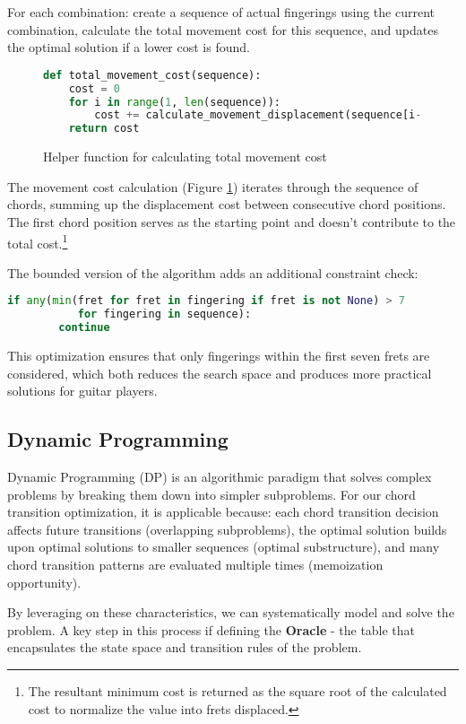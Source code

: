 \documentclass[conference]{IEEEtran}
\begin{document}
For each combination: create a sequence of actual fingerings using the current combination, calculate the total movement cost for this sequence, and updates the optimal solution if a lower cost is found.

\begin{figure}[H]
\begin{lstlisting}[language=Python]
def total_movement_cost(sequence):
    cost = 0
    for i in range(1, len(sequence)):
        cost += calculate_movement_displacement(sequence[i-1], sequence[i])
    return cost 
\end{lstlisting}
\caption{Helper function for calculating total movement cost}
\label{fig:BruteForceCost}
\end{figure}

The movement cost calculation (Figure \ref{fig:BruteForceCost}) iterates through the sequence of chords, summing up the displacement cost between consecutive chord positions. The first chord position serves as the starting point and doesn't contribute to the total cost.\footnote{The resultant minimum cost is returned as the square root of the calculated cost to normalize the value into frets displaced.}

The bounded version of the algorithm adds an additional constraint check:
\begin{lstlisting}[language=Python]
    if any(min(fret for fret in fingering if fret is not None) > 7 
           for fingering in sequence):
        continue
\end{lstlisting}

This optimization ensures that only fingerings within the first seven frets are considered, which both reduces the search space and produces more practical solutions for guitar players.

\subsection{Dynamic Programming}
Dynamic Programming (DP) is an algorithmic paradigm that solves complex problems by breaking them down into simpler subproblems. For our chord transition optimization, it is applicable because: each chord transition decision affects future transitions (overlapping subproblems), the optimal solution builds upon optimal solutions to smaller sequences (optimal substructure), and many chord transition patterns are evaluated multiple times (memoization opportunity).

By leveraging on these characteristics, we can systematically model and solve the problem. A key step in this process if defining the \textbf{Oracle} - the table that encapsulates the state space and transition rules of the problem.
\end{document}

